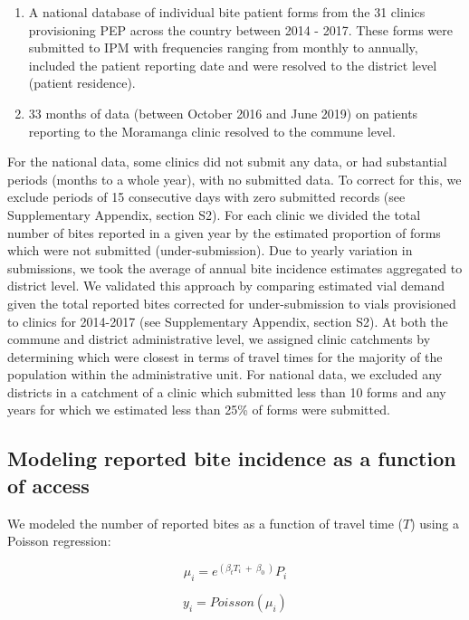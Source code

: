 \documentclass[
  oneside]{book}
\begin{document}
\begin{enumerate}
\def\labelenumi{\arabic{enumi})}
\item
  A national database of individual bite patient forms from the 31
  clinics provisioning PEP across the country between 2014 - 2017.
  These forms were submitted to IPM with frequencies ranging from
  monthly to annually, included the patient reporting date and were
  resolved to the district level (patient residence).
\item
  33 months of data (between October 2016 and June 2019) on patients
  reporting to the Moramanga clinic resolved to the commune level.
\end{enumerate}

For the national data, some clinics did not submit any data, or had
substantial periods (months to a whole year), with no submitted data. To
correct for this, we exclude periods of 15 consecutive days with zero
submitted records (see Supplementary Appendix, section S2). For each
clinic we divided the total number of bites reported in a given year by
the estimated proportion of forms which were not submitted
(under-submission). Due to yearly variation in submissions, we took the
average of annual bite incidence estimates aggregated to district level.
We validated this approach by comparing estimated vial demand given the
total reported bites corrected for under-submission to vials provisioned
to clinics for 2014-2017 (see Supplementary Appendix, section S2). At
both the commune and district administrative level, we assigned clinic
catchments by determining which were closest in terms of travel times
for the majority of the population within the administrative unit. For
national data, we excluded any districts in a catchment of a clinic
which submitted less than 10 forms and any years for which we estimated
less than 25\% of forms were submitted.

\hypertarget{modeling-reported-bite-incidence-as-a-function-of-access}{%
\subsection{Modeling reported bite incidence as a function of access}\label{modeling-reported-bite-incidence-as-a-function-of-access}}

We modeled the number of reported bites as a function of travel time
(\(T\)) using a Poisson regression:

\[\mu_{i} = e^{(\beta_{t}T_{i}\  + \ \beta_{0}\ )}P_{i}\]

\[y_{i} = Poisson(\mu_{i})\]
\end{document}
